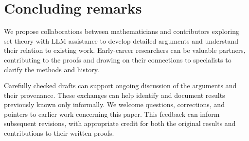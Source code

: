\documentclass[11pt,a4paper]{amsart}
\DeclareRobustCommand{\revision}[1]{#1}
\theoremstyle{plain}
\theoremstyle{definition}
\theoremstyle{remark}
\begin{document}
\section*{\revision{Concluding remarks}}

\revision{We propose collaborations between mathematicians and
contributors exploring set theory with LLM assistance to develop
detailed arguments and understand their relation to existing work.
Early-career researchers can be valuable partners, contributing to
the proofs and drawing on their connections to specialists to
clarify the methods and history.}

\revision{Carefully checked drafts can support ongoing discussion of the
arguments and their provenance. These exchanges can help identify
and document results previously known only informally. We welcome
questions, corrections, and pointers to earlier work concerning this
paper. This feedback can inform subsequent revisions, with appropriate
credit for both the original results and contributions to their
written proofs.}
\end{document}
